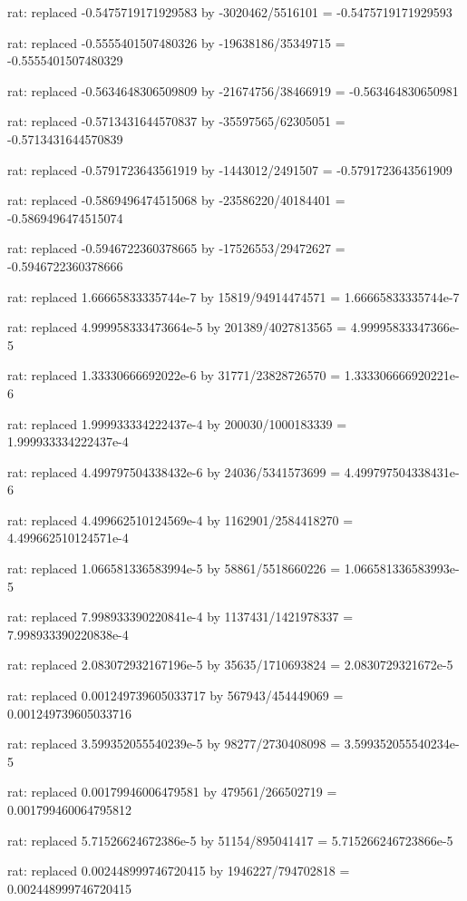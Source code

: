 \documentclass[a4paper,10pt]{article}
\begin{document}
\begin{eulernotebook}
\begin{eulercomment}
\begin{eulercomment}
\begin{eulercomment}
\begin{eulercomment}
\begin{eulercomment}
\begin{eulercomment}
\begin{eulercomment}
\begin{eulercomment}
\begin{eulercomment}
\begin{eulercomment}
\begin{eulercomment}
\begin{eulercomment}
\begin{eulercomment}
\begin{eulercomment}
\begin{eulercomment}
\begin{eulercomment}
\begin{euleroutput}
  rat: replaced -0.5475719171929583 by -3020462/5516101 = -0.5475719171929593
  
  rat: replaced -0.5555401507480326 by -19638186/35349715 = -0.5555401507480329
  
  rat: replaced -0.5634648306509809 by -21674756/38466919 = -0.563464830650981
  
  rat: replaced -0.5713431644570837 by -35597565/62305051 = -0.5713431644570839
  
  rat: replaced -0.5791723643561919 by -1443012/2491507 = -0.5791723643561909
  
  rat: replaced -0.5869496474515068 by -23586220/40184401 = -0.5869496474515074
  
  rat: replaced -0.5946722360378665 by -17526553/29472627 = -0.5946722360378666
  
  rat: replaced 1.66665833335744e-7 by 15819/94914474571 = 1.66665833335744e-7
  
  rat: replaced 4.999958333473664e-5 by 201389/4027813565 = 4.99995833347366e-5
  
  rat: replaced 1.33330666692022e-6 by 31771/23828726570 = 1.333306666920221e-6
  
  rat: replaced 1.999933334222437e-4 by 200030/1000183339 = 1.999933334222437e-4
  
  rat: replaced 4.499797504338432e-6 by 24036/5341573699 = 4.499797504338431e-6
  
  rat: replaced 4.499662510124569e-4 by 1162901/2584418270 = 4.499662510124571e-4
  
  rat: replaced 1.066581336583994e-5 by 58861/5518660226 = 1.066581336583993e-5
  
  rat: replaced 7.998933390220841e-4 by 1137431/1421978337 = 7.998933390220838e-4
  
  rat: replaced 2.083072932167196e-5 by 35635/1710693824 = 2.0830729321672e-5
  
  rat: replaced 0.001249739605033717 by 567943/454449069 = 0.001249739605033716
  
  rat: replaced 3.599352055540239e-5 by 98277/2730408098 = 3.599352055540234e-5
  
  rat: replaced 0.00179946006479581 by 479561/266502719 = 0.001799460064795812
  
  rat: replaced 5.71526624672386e-5 by 51154/895041417 = 5.715266246723866e-5
  
  rat: replaced 0.002448999746720415 by 1946227/794702818 = 0.002448999746720415
  

\end{euleroutput}
\end{eulercomment}
\end{eulercomment}
\end{eulercomment}
\end{eulercomment}
\end{eulercomment}
\end{eulercomment}
\end{eulercomment}
\end{eulercomment}
\end{eulercomment}
\end{eulercomment}
\end{eulercomment}
\end{eulercomment}
\end{eulercomment}
\end{eulercomment}
\end{eulercomment}
\end{eulercomment}
\end{eulernotebook}
\end{document}

